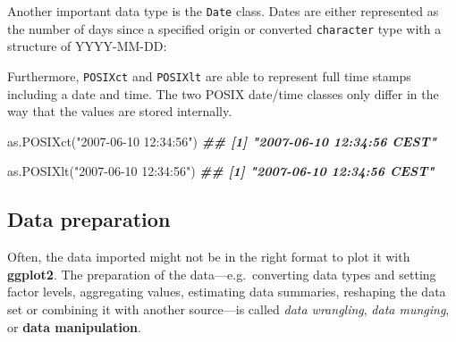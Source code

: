 \documentclass[
]{krantz}
\makeatletter
\newenvironment{Shaded}{\begin{snugshade}}{\end{snugshade}}
\newcommand{\AttributeTok}[1]{\textcolor[rgb]{0.61,0.61,0.61}{#1}}
\newcommand{\DecValTok}[1]{\textcolor[rgb]{0.06,0.06,0.06}{#1}}
\newcommand{\DocumentationTok}[1]{\textcolor[rgb]{0.37,0.37,0.37}{\textbf{\textit{#1}}}}
\newcommand{\FunctionTok}[1]{\textcolor[rgb]{0,0,0}{#1}}
\newcommand{\NormalTok}[1]{#1}
\newcommand{\SpecialCharTok}[1]{\textcolor[rgb]{0,0,0}{#1}}
\newcommand{\StringTok}[1]{\textcolor[rgb]{0.5,0.5,0.5}{#1}}
\newenvironment{kframe}{%
\medskip{}
\setlength{\fboxsep}{.8em}
 \def\at@end@of@kframe{}%
 \ifinner\ifhmode%
  \def\at@end@of@kframe{\end{minipage}}%
  \begin{minipage}{\columnwidth}%
 \fi\fi%
 \def\FrameCommand##1{\hskip\@totalleftmargin \hskip-\fboxsep
 \colorbox{shadecolor}{##1}\hskip-\fboxsep
     \hskip-\linewidth \hskip-\@totalleftmargin \hskip\columnwidth}%
 \MakeFramed {\advance\hsize-\width
   \@totalleftmargin\z@ \linewidth\hsize
   \@setminipage}}%
 {\par\unskip\endMakeFramed%
 \at@end@of@kframe}
\renewenvironment{Shaded}{\begin{kframe}}{\end{kframe}}
\makeatother
\begin{document}
Another important data type is the \texttt{Date} class. Dates are either represented as the number of days since a specified origin or converted \texttt{character} type with a structure of YYYY-MM-DD:

\begin{Shaded}
\end{Shaded}

Furthermore, \texttt{POSIXct} and \texttt{POSIXlt} are able to represent full time stamps including a date and time. The two POSIX date/time classes only differ in the way that the values are stored internally.

\begin{Shaded}
\begin{Highlighting}[]
\FunctionTok{as.POSIXct}\NormalTok{(}\StringTok{"2007{-}06{-}10 12:34:56"}\NormalTok{)}
\DocumentationTok{\#\# [1] "2007{-}06{-}10 12:34:56 CEST"}

\FunctionTok{as.POSIXlt}\NormalTok{(}\StringTok{"2007{-}06{-}10 12:34:56"}\NormalTok{)}
\DocumentationTok{\#\# [1] "2007{-}06{-}10 12:34:56 CEST"}
\end{Highlighting}
\end{Shaded}

\hypertarget{preparation}{%
\subsection{Data preparation}\label{preparation}}

Often, the data imported might not be in the right format to plot it with \textbf{ggplot2}. The preparation of the data---e.g.~converting data types and setting factor levels, aggregating values, estimating data summaries, reshaping the data set or combining it with another source---is called \emph{data wrangling}, \emph{data munging}, or \textbf{data manipulation}.
\end{document}
